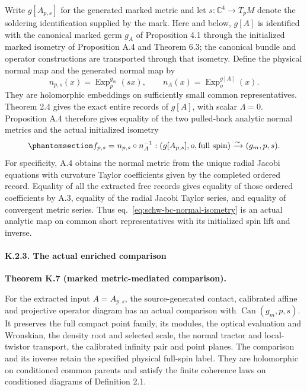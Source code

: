 \documentclass[
  english,
  11pt,
  reqno]{amsart}
\makeatletter
\newcommand{\pandocstatementheading}[1]{%
  \par\addpenalty{\@beginparpenalty}%
  \addvspace{.5\baselineskip plus .2\baselineskip minus .2\baselineskip}%
  {\normalfont\bfseries #1\par}%
  \nobreak\@afterindenttrue\@afterheading
}
\makeatother
\begin{document}
Write \(g[A_{p,s}]\) for the generated marked metric and let
\(s:\mathbb C^4\to T_pM\) denote the soldering identification supplied
by the mark. Here and below, \(g[A]\) is identified with the canonical
marked germ \(g_A\) of Proposition 4.1 through the initialized marked
isometry of Proposition A.4 and Theorem 6.3; the canonical bundle and
operator constructions are transported through that isometry. Define the
physical normal map and the generated normal map by \[
 n_{p,s}(x)=\operatorname{Exp}^{g_m}_p(sx),\qquad
 n_A(x)=\operatorname{Exp}^{g[A]}_o(x).
\] They are holomorphic embeddings on sufficiently small common
representatives. Theorem 2.4 gives the exact entire records of \(g[A]\),
with scalar \(\Lambda=0\). Proposition A.4 therefore gives equality of
the two pulled-back analytic normal metrics and the actual initialized
isometry
\begin{equation}\protect\phantomsection\label{eq:schw-bc-normal-isometry}{
 f_{p,s}=n_{p,s}\circ n_A^{-1}:
 (g[A_{p,s}],o,\text{full spin})\xrightarrow{\sim}(g_m,p,s).
}\end{equation} For specificity, A.4 obtains the normal metric from the
unique radial Jacobi equations with curvature Taylor coefficients given
by the completed ordered record. Equality of all the extracted free
records gives equality of those ordered coefficients by A.3, equality of
the radial Jacobi Taylor series, and equality of convergent metric
series. Thus eq.~\ref{eq:schw-bc-normal-isometry} is an actual analytic
map on common short representatives with its initialized spin lift and
inverse.

\protect{}\label{sec:schw-bc-typed-comparison}

\protect{}\label{sec:sh-comparison-3}

\paragraph{K.2.3. The actual enriched
comparison}\label{k.2.3.-the-actual-enriched-comparison}

\pandocstatementheading{\protect{}\label{thm:schw-bc-metric-mediated-comparison}Theorem K.7 (marked metric-mediated comparison).}

For the extracted input \(A=A_{p,s}\), the source-generated contact,
calibrated affine and projective operator diagram has an actual
comparison with \(\operatorname{Can}(g_m,p,s)\). It preserves the full
compact point family, its modules, the optical evaluation and Wronskian,
the density root and selected scale, the normal tractor and
local-twistor transport, the calibrated infinity pair and point planes.
The comparison and its inverse retain the specified physical full-spin
label. They are holomorphic on conditioned common parents and satisfy
the finite coherence laws on conditioned diagrams of Definition 2.1.
\end{document}
